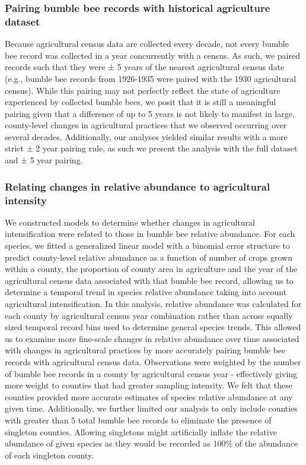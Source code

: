 \documentclass[11pt,]{article}
\begin{document}
\hypertarget{pairing-bumble-bee-records-with-historical-agriculture-dataset}{%
\subsubsection{Pairing bumble bee records with historical agriculture
dataset}\label{pairing-bumble-bee-records-with-historical-agriculture-dataset}}

Because agricultural census data are collected every decade, not every
bumble bee record was collected in a year concurrently with a census. As
such, we paired records such that they were ± 5 years of the nearest
agricultural census date (e.g., bumble bee records from 1926-1935 were
paired with the 1930 agricultural census). While this pairing may not
perfectly reflect the state of agriculture experienced by collected
bumble bees, we posit that it is still a meaningful pairing given that a
difference of up to 5 years is not likely to manifest in large,
county-level changes in agricultural practices that we observed
occurring over several decades. Additionally, our analyses yielded
similar results with a more strict ± 2 year pairing rule, as such we
present the analysis with the full dataset and ± 5 year pairing.

\hypertarget{relating-changes-in-relative-abundance-to-agricultural-intensity}{%
\subsubsection{Relating changes in relative abundance to agricultural
intensity}\label{relating-changes-in-relative-abundance-to-agricultural-intensity}}

We constructed models to determine whether changes in agricultural
intensification were related to those in bumble bee relative abundance.
For each species, we fitted a generalized linear model with a binomial
error structure to predict county-level relative abundance as a function
of number of crops grown within a county, the proportion of county area
in agriculture and the year of the agricultural census data associated
with that bumble bee record, allowing us to determine a temporal trend
in species relative abundance taking into account agricultural
intensification. In this analysis, relative abundance was calculated for
each county by agricultural census year combination rather than across
equally sized temporal record bins used to determine general species
trends. This allowed us to examine more fine-scale changes in relative
abundance over time associated with changes in agricultural practices by
more accurately pairing bumble bee records with agricultural census
data. Observations were weighted by the number of bumble bee records in
a county by agricultural census year - effectively giving more weight to
counties that had greater sampling intensity. We felt that these
counties provided more accurate estimates of species relative abundance
at any given time. Additionally, we further limited our analysis to only
include counties with greater than 5 total bumble bee records to
eliminate the presence of singleton counties. Allowing singletons might
artificially inflate the relative abundance of given species as they
would be recorded as 100\% of the abundance of each singleton county.
\end{document}
